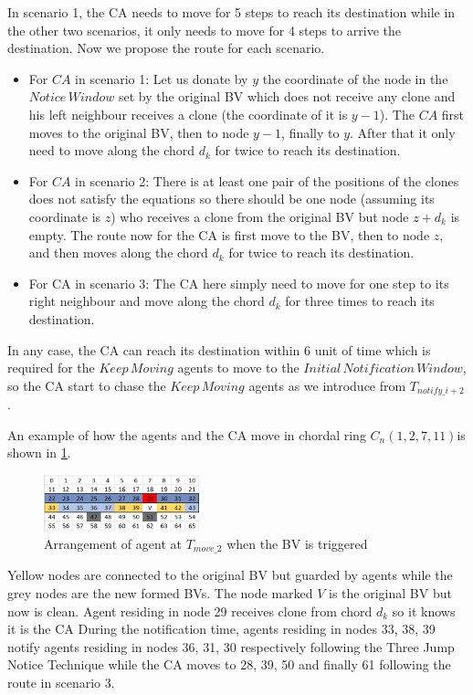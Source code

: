 \documentclass[conference]{IEEEtran}
\begin{document}
In scenario 1, the CA needs to move for 5 steps to reach its destination while in the other two scenarios, it only needs to move for 4 steps to arrive the destination. Now we propose the route for each scenario.
\begin{itemize}
\item For $CA$ in scenario 1: Let us donate by $y$ the coordinate of the node in the $Notice\,Window$ set by the original BV which does not receive any clone and his left neighbour receives a clone (the coordinate of it is $y-1$). The $CA$ first moves to the original BV, then to node $y-1$, finally to $y$. After that it only need to move along the chord $d_k$ for twice to reach its destination.
\item For $CA$ in scenario 2: There is at least one pair of the positions of the clones does not satisfy the equations so there should be one node (assuming its coordinate is $z$) who receives a clone from the original BV but node $z+d_k$ is empty. The route now for the CA is first move to the BV, then to node $z$, and then moves along the chord $d_k$ for twice to reach its destination.
\item For CA in scenario 3: The CA here simply need to move for one step to its right neighbour and move along the chord $d_k$ for three times to reach its destination.
\end{itemize}


In any case, the CA can reach its destination within 6 unit of time which is required for the $Keep\,Moving$ agents to move to the $Initial\,Notification\,Window$, so the CA start to chase the $Keep\,Moving$ agents as we introduce from $T_{notify\_{i+2}}$. 

An example of how the agents and the CA move in chordal ring $C_n(1, 2, 7, 11)$is shown in \ref{fig:T29}. 
\begin{figure}[H]
  \centering  
  \includegraphics[width=0.4\textwidth]{figures/T29.png}
  \caption{Arrangement of agent at $T_{move\_2}$ when the BV is triggered}\label{fig:T29}
\end{figure}

Yellow nodes are connected to the original BV but guarded by agents while the grey nodes are the new formed BVs. The node marked $V$ is the original BV but now is clean. Agent residing in node 29 receives clone from chord $d_k$ so it knows it is the CA During the notification time, agents residing in nodes 33, 38, 39 notify agents residing in nodes 36, 31, 30 respectively following the Three Jump Notice Technique while the CA moves to 28, 39, 50 and finally 61 following the route in scenario 3.
\end{document}
